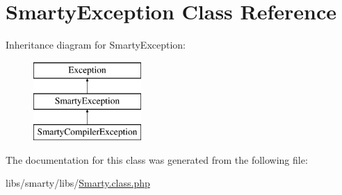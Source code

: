 \hypertarget{class_smarty_exception}{}\section{Smarty\+Exception Class Reference}
\label{class_smarty_exception}
Inheritance diagram for Smarty\+Exception\+:\begin{figure}[H]
\begin{center}
\leavevmode
\includegraphics[height=3.000000cm]{class_smarty_exception}
\end{center}
\end{figure}


The documentation for this class was generated from the following file\+:\begin{DoxyCompactItemize}
\item 
libs/smarty/libs/\hyperlink{_smarty_8class_8php}{Smarty.\+class.\+php}\end{DoxyCompactItemize}
